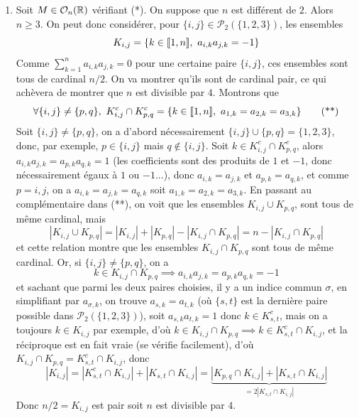 \begin{solution}
\begin{enumerate}
		\item Soit $M\in\mathcal O_n(\operatorname{\mathbb R})$ vérifiant (*).
		On suppose que $n$ est différent de $2$. Alors $n\geq 3$.
		On peut donc considérer, pour $\lbrace i,j\rbrace\in\mathcal P_2(\lbrace1,2,3\rbrace)$, les ensembles
		\[
			K_{i,j}=\lbrace k \in\inl1n,\ a_{i,k}a_{j,k}=-1\rbrace	
		\]
		Comme $\sum_{k=1}^na_{i,k}a_{j,k}=0$ pour une certaine paire $\lbrace i,j\rbrace$, ces ensembles sont tous de cardinal $n/2$. 
		On va montrer qu'ils sont de cardinal pair, ce qui achèvera de montrer que $n$ est divisible par $4$.
		Montrons que 
		\[
			\forall \lbrace i,j\rbrace\neq\lbrace p,q\rbrace,\ K_{i,j}^c\cap K_{p,q}^c=\lbrace k\in[\![1,n]\!],\ a_{1,k}=a_{2,k}=a_{3,k}\rbrace\tag*{(**)}
		\]
		Soit $\lbrace i,j\rbrace\neq\lbrace p,q\rbrace$, on a d'abord nécessairement $\lbrace i,j\rbrace\cup\lbrace p,q\rbrace=\lbrace 1,2,3\rbrace$,
		donc, par exemple, $p\in\lbrace i,j\rbrace$ mais $q\notin \lbrace i,j\rbrace$.
		Soit $k\in K_{i,j}^c\cap K_{p,q}^c$, alors $a_{i,k}a_{j,k}=a_{p,k}a_{q,k}=1$
		(les coefficients sont des produits de $1$ et $-1$, donc nécessairement égaux à $1$ ou $-1$...),
		donc $a_{i,k}=a_{j,k}$ et $a_{p,k}=a_{q,k}$, et comme $p=i,j$, on a $a_{i,k}=a_{j,k}=a_{q,k}$ soit $a_{1,k}=a_{2,k}=a_{3,k}$.
		En passant au complémentaire dans (**), on voit que les ensembles $K_{i,j}\cup K_{p,q}$, sont tous de même cardinal, mais 
		\[
			|K_{i,j}\cup K_{p,q}|=|K_{i,j}|+|K_{p,q}|-|K_{i,j}\cap K_{p,q}|=n-|K_{i,j}\cap K_{p,q}|
		\]
		et cette relation montre que les ensembles $K_{i,j}\cap K_{p,q}$ sont tous de même cardinal.
		Or, si $\lbrace i,j\rbrace\neq\lbrace p,q\rbrace$, on a 
		\[
			k\in K_{i,j}\cap K_{p,q}\implies a_{i,k}a_{j,k}=a_{p,k}a_{q,k}=-1
		\]
		et sachant que parmi les deux paires choisies, il y a un indice commun $\sigma$, en simplifiant par $a_{\sigma,k}$,
		on trouve $a_{s,k}=a_{t,k}$ (où $\lbrace s,t\rbrace$ est la dernière paire possible dans $\mathcal P_2(\lbrace 1,2,3\rbrace)$), soit 
		$a_{s,k}a_{t,k}=1$ donc $k\in K_{s,t}^c$, mais on a toujours $k\in K_{i,j}$ par exemple, d'où $k\in K_{i,j}\cap K_{p,q}\implies k\in K_{s,t}^c\cap K_{i,j}$,
		et la réciproque est en fait vraie (se vérifie facilement), d'où $K_{i,j}\cap K_{p,q}=K_{s,t}^c\cap K_{i,j}$, donc 
		\[
			|K_{i,j}|=|K_{s,t}^c\cap K_{i,j}|+|K_{s,t}\cap K_{i,j}|=\underbrace{|K_{p,q}\cap K_{i,j}|+|K_{s,t}\cap K_{i,j}|}_{=2|K_{s,t}\cap K_{i,j}|}
		\]
		Donc $n/2=K_{i,j}$ est pair soit $n$ est divisible par $4$.
	\end{enumerate}
\end{solution}

